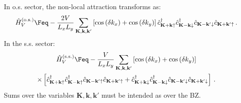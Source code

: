 In o.s. sector, the non-local attraction transforms as:
\begin{equation}\label{eq:HV-os-fourier}
	\hat H_V^{(\mathrm{o.s.})} \Feq - \frac{2V}{L_x L_y}
	\sum_{\mathbf{K}, \mathbf{k}, \mathbf{k}'} \left[
	\cos \left(
	\delta k_x
	\right)	+ \cos \left(
	\delta k_y
	\right)	
	\right]	\hat c_{\mathbf{K}+\mathbf{k} \uparrow}^\dagger \hat c_{\mathbf{K}-\mathbf{k}\downarrow}^\dagger \hat c_{\mathbf{K}-\mathbf{k}'\downarrow} \hat c_{\mathbf{K}+\mathbf{k}'\uparrow} \, .
\end{equation}
In the s.s. sector:
\begin{multline}\label{eq:HV-ss-fourier}
	\hat H_V^{(\mathrm{s.s.})} \Feq - \frac{V}{L_x L_y}
	\sum_{\mathbf{K}, \mathbf{k}, \mathbf{k}'} \left[
	\cos \left(
	\delta k_x
	\right)	+ \cos \left(
	\delta k_y
	\right)	
	\right]\\
	\times \left[
	\hat c_{\mathbf{K}+\mathbf{k} \uparrow}^\dagger \hat c_{\mathbf{K}-\mathbf{k}\uparrow}^\dagger \hat c_{\mathbf{K}-\mathbf{k}'\uparrow} \hat c_{\mathbf{K}+\mathbf{k}'\uparrow} + \hat c_{\mathbf{K}+\mathbf{k} \downarrow}^\dagger \hat c_{\mathbf{K}-\mathbf{k}\downarrow}^\dagger \hat c_{\mathbf{K}-\mathbf{k}'\downarrow} \hat c_{\mathbf{K}+\mathbf{k}'\downarrow}
	\right] \, .
\end{multline}
Sums over the variables $\mathbf{K}, \mathbf{k}, \mathbf{k}'$ must be intended as over the BZ.

